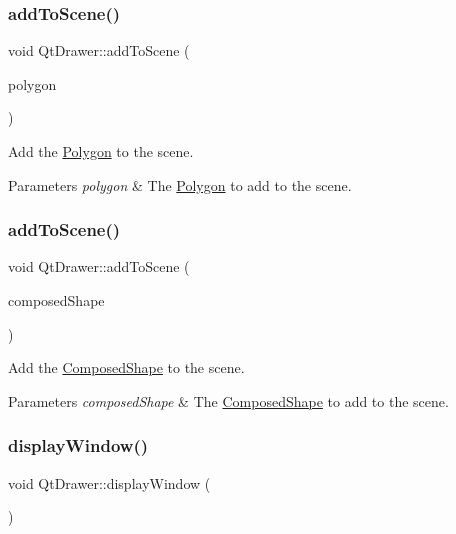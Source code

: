 \subsubsection{\texorpdfstring{add\+To\+Scene()}{addToScene()}\hspace{0.1cm}{\footnotesize\ttfamily [4/5]}}
{\footnotesize\ttfamily void Qt\+Drawer\+::add\+To\+Scene (\begin{DoxyParamCaption}\item[{const \hyperlink{class_polygon}{Polygon} $\ast$}]{polygon }\end{DoxyParamCaption})}

Add the \hyperlink{class_polygon}{Polygon} to the scene. 
\begin{DoxyParams}{Parameters}
{\em polygon} & The \hyperlink{class_polygon}{Polygon} to add to the scene. \\
\hline
\end{DoxyParams}
\hypertarget{class_qt_drawer_adaec0c490edc2cd18ece227a0f56dbfa}{}\label{class_qt_drawer_adaec0c490edc2cd18ece227a0f56dbfa} 
\subsubsection{\texorpdfstring{add\+To\+Scene()}{addToScene()}\hspace{0.1cm}{\footnotesize\ttfamily [5/5]}}
{\footnotesize\ttfamily void Qt\+Drawer\+::add\+To\+Scene (\begin{DoxyParamCaption}\item[{const \hyperlink{class_composed_shape}{Composed\+Shape} $\ast$}]{composed\+Shape }\end{DoxyParamCaption})}

Add the \hyperlink{class_composed_shape}{Composed\+Shape} to the scene. 
\begin{DoxyParams}{Parameters}
{\em composed\+Shape} & The \hyperlink{class_composed_shape}{Composed\+Shape} to add to the scene. \\
\hline
\end{DoxyParams}
\hypertarget{class_qt_drawer_a43c474754631c15519485533caf18a89}{}\label{class_qt_drawer_a43c474754631c15519485533caf18a89} 
\subsubsection{\texorpdfstring{display\+Window()}{displayWindow()}}
{\footnotesize\ttfamily void Qt\+Drawer\+::display\+Window (\begin{DoxyParamCaption}{ }\end{DoxyParamCaption})}

